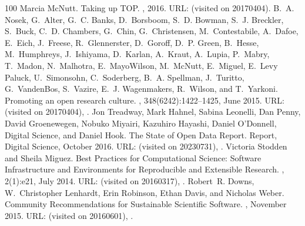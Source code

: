 \documentclass[letterpaper,table,10pt,english]{jupyterBook}
\begin{document}
\begin{sphinxthebibliography}{100}
\sphinxAtStartPar
Marcia McNutt. Taking up TOP. , 2016. URL:  (visited on 2017\sphinxhyphen{}04\sphinxhyphen{}04).
\sphinxAtStartPar
B. A. Nosek, G. Alter, G. C. Banks, D. Borsboom, S. D. Bowman, S. J. Breckler, S. Buck, C. D. Chambers, G. Chin, G. Christensen, M. Contestabile, A. Dafoe, E. Eich, J. Freese, R. Glennerster, D. Goroff, D. P. Green, B. Hesse, M. Humphreys, J. Ishiyama, D. Karlan, A. Kraut, A. Lupia, P. Mabry, T. Madon, N. Malhotra, E. Mayo\sphinxhyphen{}Wilson, M. McNutt, E. Miguel, E. Levy Paluck, U. Simonsohn, C. Soderberg, B. A. Spellman, J. Turitto, G. VandenBos, S. Vazire, E. J. Wagenmakers, R. Wilson, and T. Yarkoni. Promoting an open research culture. , 348(6242):1422–1425, June 2015. URL:  (visited on 2017\sphinxhyphen{}04\sphinxhyphen{}04), .
\sphinxAtStartPar
Jon Treadway, Mark Hahnel, Sabina Leonelli, Dan Penny, David Groenewegen, Nobuko Miyairi, Kazuhiro Hayashi, Daniel O'Donnell, Digital Science, and Daniel Hook. The State of Open Data Report. Report, Digital Science, October 2016. URL:  (visited on 2023\sphinxhyphen{}07\sphinxhyphen{}31), .
\sphinxAtStartPar
Victoria Stodden and Sheila Miguez. Best Practices for Computational Science: Software Infrastructure and Environments for Reproducible and Extensible Research. , 2(1):e21, July 2014. URL:  (visited on 2016\sphinxhyphen{}03\sphinxhyphen{}17), .
\sphinxAtStartPar
Robert R. Downs, W. Christopher Lenhardt, Erin Robinson, Ethan Davis, and Nicholas Weber. Community Recommendations for Sustainable Scientific Software. , November 2015. URL:  (visited on 2016\sphinxhyphen{}06\sphinxhyphen{}01), .

\end{sphinxthebibliography}
\end{document}
